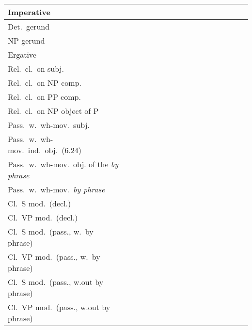 \begin{center}
\begin{tabular}{|p{2.2in}||*{16}{c|}}
\hline
Imperative & & & & & & & & & & & & & & & \\
\hline
Det.\ gerund & & & & & & & & & & & & & & & \\
\hline
NP gerund & & & & & & & & & & & & & & & \\
\hline
Ergative & & & & & & & & & & & & & & & \\
\hline
Rel.\ cl.\ on subj. & & & & & & & & & & & & & & & \\
\hline
Rel.\ cl.\ on NP comp. & & & & & & & & & & & & & & & \\
\hline
Rel.\ cl.\ on PP comp. & & & & & & & & & & & & & & & \\
\hline
Rel.\ cl.\ on NP object of P & & & & & & & & & & & & & & & \\
\hline
Pass.\ w.\ wh-mov.\ subj.\ & & & & & & & & & & & & & & & \\
\hline
Pass.\ w.\ wh-mov.\ ind.\ obj.\ (6.24) & & & & & & & & & & & & & & & \\
\hline
Pass.\ w.\ wh-mov.\ obj. of the {\it by phrase} & & & & & & & & & & & & & & & \\
\hline
Pass.\ w.\ wh-mov.\ {\it by phrase} & & & & & & & & & & & & & & & \\
\hline
Cl.\ S mod.\ (decl.) & & & & & & & & & & & & & & & \\
\hline
Cl.\ VP mod.\ (decl.) & & & & & & & & & & & & & & & \\
\hline
Cl.\ S mod.\ (pass., w.\ by phrase) & & & & & & & & & & & & & & & \\
\hline
Cl.\ VP mod.\ (pass., w.\ by phrase) & & & & & & & & & & & & & & & \\
\hline
Cl.\ S mod.\ (pass., w.out by phrase) & & & & & & & & & & & & & & & \\
\hline
Cl.\ VP mod.\ (pass., w.out by phrase) & & & & & & & & & & & & & & & \\
\hline
\end{tabular}
\end{center}

\clearpage

\vspace*{-0.5in}

